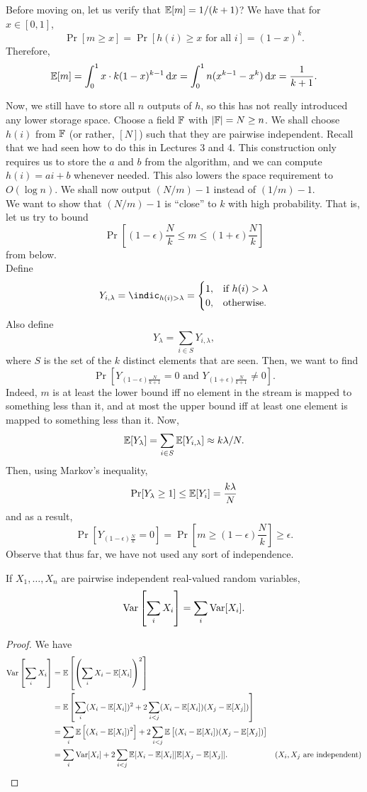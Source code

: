 			Before moving on, let us verify that $\mathbb{E}[m] = 1/(k+1)$? We have that for $x \in [0,1]$,
			\[ \Pr[m \ge x] = \Pr[h(i) \ge x \text{ for all $i$}] = (1-x)^k. \]
			Therefore,
			\[ \E[m] = \int_0^1 x \cdot k (1-x)^{k-1} \dif x = \int_0^1 n(x^{k-1} - x^k) \dif x = \frac{1}{k+1}. \]

			Now, we still have to store all $n$ outputs of $h$, so this has not really introduced any lower storage space. Choose a field $\mathbb{F}$ with $|\mathbb{F}| = N \ge n$. We shall choose $h(i)$ from $\mathbb{F}$ (or rather, $[N]$) such that they are pairwise independent. Recall that we had seen how to do this in Lectures 3 and 4. This construction only requires us to store the $a$ and $b$ from the algorithm, and we can compute $h(i) = ai+b$ whenever needed. This also lowers the space requirement to $O(\log n)$.  We shall now output $(N/m)-1$ instead of $(1/m)-1$.\\
			We want to show that $(N/m)-1$ is ``close'' to $k$ with high probability. That is, let us try to bound
			\[ \Pr\left[ (1-\epsilon)\frac{N}{k} \le m \le (1+\epsilon)\frac{N}{k} \right] \]
			from below.\\
			Define
			\[ Y_{i,\lambda} = \indic_{h(i) > \lambda} = \begin{cases} 1, & \text{if $h(i) > \lambda$} \\ 0, & \text{otherwise.} \end{cases} \]
			Also define
			\[ Y_\lambda = \sum_{i \in S} Y_{i,\lambda}, \]
			where $S$ is the set of the $k$ distinct elements that are seen. Then, we want to find
			\[ \Pr\left[ Y_{(1-\epsilon)\frac{N}{k+1}} = 0 \text{ and } Y_{(1+\epsilon)\frac{N}{k+1}} \ne 0 \right]. \]
			Indeed, $m$ is at least the lower bound iff no element in the stream is mapped to something less than it, and at most the upper bound iff at least one element is mapped to something less than it. Now,
			\[ \mathbb{E}[Y_\lambda] = \sum_{i \in S} \mathbb{E}[Y_{i,\lambda}] \approx k\lambda/N. \]
			Then, using Markov's inequality,
			\[ \Pr[Y_\lambda \ge 1] \le \mathbb{E}[Y_i] = \frac{k\lambda}{N} \]
			and as a result,
			\[ \Pr[Y_{(1-\epsilon)\frac{N}{k}} = 0] = \Pr\left[ m \ge (1-\epsilon)\frac{N}{k} \right] \ge \epsilon. \]
			Observe that thus far, we have not used any sort of independence.

			\begin{flem}
				If $X_1,\ldots,X_n$ are pairwise independent real-valued random variables,
				\[ \operatorname{Var}\left[\sum_i X_i\right] = \sum_i \operatorname{Var}[X_i]. \]
			\end{flem}
			\begin{proof}
				We have
				\begin{align*}
					\operatorname{Var}\left[\sum_i X_i\right] &= \mathbb{E}\left[ \left(\sum_i X_i - \mathbb{E}[X_i]\right)^2 \right] \\
						&= \mathbb{E}\left[ \sum_i (X_i - \mathbb{E}[X_i])^2 + 2\sum_{i < j} (X_i - \mathbb{E}[X_i])(X_j - \mathbb{E}[X_j]) \right] \\
						&= \sum_i \mathbb{E}\left[ (X_i-\mathbb{E}[X_i])^2 \right] + 2\sum_{i<j} \mathbb{E}\left[ (X_i-\mathbb{E}[X_i])(X_j-\mathbb{E}[X_j]) \right] \\
						&= \sum_i \operatorname{Var}[X_i] + 2\sum_{i<j} \mathbb{E}[X_i-\mathbb{E}[X_i]]\mathbb{E}[X_j-\mathbb{E}[X_j]] . & \text{($X_i,X_j$ are independent)}
				\end{align*}
			\end{proof}

